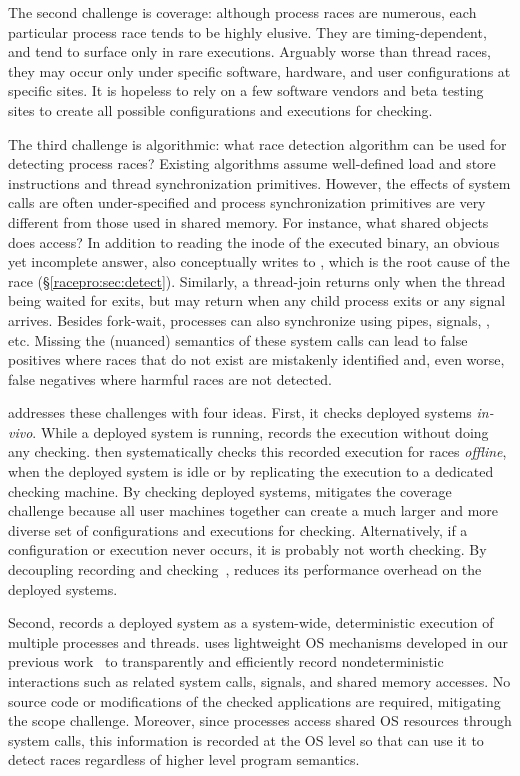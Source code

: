 The second challenge is coverage: although process races are numerous,
each particular process race tends to be highly elusive.
They are timing-dependent, and tend to surface only in rare
executions.  Arguably worse than thread races, they may occur only under
specific software, hardware, and user configurations at specific
sites.  It is hopeless to rely on a few software vendors and beta
testing sites to create all possible configurations and executions for
checking. 

The third challenge is algorithmic: what race detection algorithm can
be used for detecting process races?  Existing algorithms assume
well-defined load and store instructions and thread synchronization
primitives.   However, the effects of system calls are often
under-specified and process synchronization primitives are very
different from those used in shared memory. For instance, what shared objects
does  access?  In addition to reading the inode of the
executed binary, an obvious yet incomplete answer,  also
conceptually writes to , which is the root cause of the
 race (\S\ref{racepro:sec:detect}).  Similarly, a
thread-join returns only when the thread being waited for exits, but
 may return when any child process exits or any signal arrives.
Besides fork-wait, processes can also synchronize using
pipes, signals, , etc.
Missing the (nuanced) semantics of these system calls can lead to false positives
where races that do not exist are mistakenly identified and, even
worse, false negatives where harmful races are not detected. 

\racepro addresses these challenges with four ideas.  First, it checks
deployed systems \emph{in-vivo}.  While a deployed system is running, \racepro
records the execution without doing any checking.  \racepro then
systematically checks this recorded execution for races \emph{offline},
when the deployed system is idle or by replicating the execution to a
dedicated checking machine.  By checking deployed systems, \racepro mitigates
the coverage challenge because all user machines together can create a
much larger and more diverse set of configurations and executions for
checking.  Alternatively, if a configuration or execution never occurs, it
is probably not worth checking.  By decoupling recording and
checking~\cite{decouple:usenix08}, \racepro reduces its performance overhead
on the deployed systems.

Second, \racepro records a deployed system as a system-wide, deterministic
execution of multiple processes and threads. \racepro uses lightweight OS
mechanisms developed in our previous work~\cite{scribe:sigmetrics10}
to transparently and efficiently record nondeterministic interactions
such as related system calls, signals, and shared memory accesses.
No source code or modifications of
the checked applications are required, mitigating the scope challenge.
Moreover, since processes access shared OS resources through system
calls, this information is recorded at the OS level so that \racepro can
use it to detect races regardless of higher level program semantics.  

